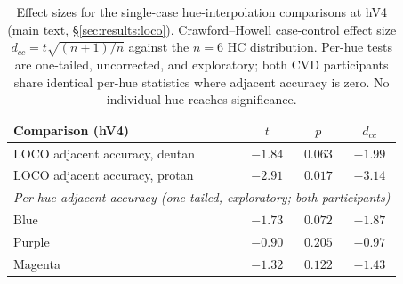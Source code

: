 \begin{table}[h]
\centering
\caption{Effect sizes for the single-case hue-interpolation comparisons at hV4 (main text, \S\ref{sec:results:loco}). Crawford--Howell case-control effect size $d_{cc} = t\sqrt{(n+1)/n}$ against the $n = 6$ HC distribution. Per-hue tests are one-tailed, uncorrected, and exploratory; both CVD participants share identical per-hue statistics where adjacent accuracy is zero. No individual hue reaches significance.}
\label{tab:effect_sizes}
\begin{tabular}{lccc}
\toprule
Comparison (hV4) & $t$ & $p$ & $d_{cc}$ \\
\midrule
LOCO adjacent accuracy, deutan & $-1.84$ & $0.063$ & $-1.99$ \\
LOCO adjacent accuracy, protan & $-2.91$ & $0.017$ & $-3.14$ \\
\midrule
\multicolumn{4}{l}{\emph{Per-hue adjacent accuracy (one-tailed, exploratory; both participants)}} \\
Blue & $-1.73$ & $0.072$ & $-1.87$ \\
Purple & $-0.90$ & $0.205$ & $-0.97$ \\
Magenta & $-1.32$ & $0.122$ & $-1.43$ \\
\bottomrule
\end{tabular}
\end{table}


